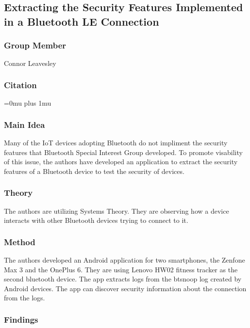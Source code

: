 \noindent
\subsection{Extracting the Security Features Implemented in a Bluetooth LE Connection}

\subsubsection{Group Member}

\noindent
Connor Leavesley

\noindent
\subsubsection{Citation}

\Urlmuskip=0mu plus 1mu\relax

\subsubsection{Main Idea}

\noindent
Many of the IoT devices adopting Bluetooth do not impliment the security features that Bluetooth Special Interest Group developed. To promote visability of this issue, the authors have developed an application to extract the security features of a Bluetooth device to test the security of devices. 

\subsubsection{Theory}

\noindent
The authors are utilizing Systems Theory. They are observing how a device interacts with other Bluetooth devices trying to connect to it.

\subsubsection{Method}

\noindent
The authors developed an Android application for two smartphones, the Zenfone Max 3 and the OnePlus 6. They are using  Lenovo HW02 fitness tracker as the second bluetooth device. The app extracts logs from the btsnoop log created by Android devices. The app can discover security information about the connection from the logs.

\subsubsection{Findings}


